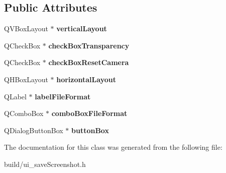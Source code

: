 \subsection*{Public Attributes}
\begin{DoxyCompactItemize}
\item 
\hypertarget{class_ui___save_screenshot_dialog_a50551a422d72e27c8ea91e4e25820e5b}{}Q\+V\+Box\+Layout $\ast$ {\bfseries vertical\+Layout}\label{class_ui___save_screenshot_dialog_a50551a422d72e27c8ea91e4e25820e5b}

\item 
\hypertarget{class_ui___save_screenshot_dialog_aa7b444c1d81067f51a07851a8b51a774}{}Q\+Check\+Box $\ast$ {\bfseries check\+Box\+Transparency}\label{class_ui___save_screenshot_dialog_aa7b444c1d81067f51a07851a8b51a774}

\item 
\hypertarget{class_ui___save_screenshot_dialog_ac435a589fe451a41a2fb9071f7f75b36}{}Q\+Check\+Box $\ast$ {\bfseries check\+Box\+Reset\+Camera}\label{class_ui___save_screenshot_dialog_ac435a589fe451a41a2fb9071f7f75b36}

\item 
\hypertarget{class_ui___save_screenshot_dialog_a9bf97dfa4fe810ec90c566ddb2ea4b1c}{}Q\+H\+Box\+Layout $\ast$ {\bfseries horizontal\+Layout}\label{class_ui___save_screenshot_dialog_a9bf97dfa4fe810ec90c566ddb2ea4b1c}

\item 
\hypertarget{class_ui___save_screenshot_dialog_a63a7fc34977b9e74653d42591600a184}{}Q\+Label $\ast$ {\bfseries label\+File\+Format}\label{class_ui___save_screenshot_dialog_a63a7fc34977b9e74653d42591600a184}

\item 
\hypertarget{class_ui___save_screenshot_dialog_ab79b55254217386bfe68a22d6562c996}{}Q\+Combo\+Box $\ast$ {\bfseries combo\+Box\+File\+Format}\label{class_ui___save_screenshot_dialog_ab79b55254217386bfe68a22d6562c996}

\item 
\hypertarget{class_ui___save_screenshot_dialog_a3041f589bfa376b59269522262683482}{}Q\+Dialog\+Button\+Box $\ast$ {\bfseries button\+Box}\label{class_ui___save_screenshot_dialog_a3041f589bfa376b59269522262683482}

\end{DoxyCompactItemize}


The documentation for this class was generated from the following file\+:\begin{DoxyCompactItemize}
\item 
build/ui\+\_\+save\+Screenshot.\+h\end{DoxyCompactItemize}
